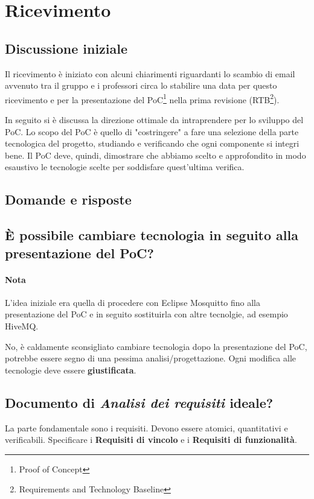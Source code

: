 \section{Ricevimento}

\subsection{Discussione iniziale}

Il ricevimento è iniziato con alcuni chiarimenti riguardanti lo scambio di email avvenuto tra il gruppo e i professori circa lo stabilire una data per questo ricevimento e per la presentazione del PoC\footnote{Proof of Concept} nella prima revisione (RTB\footnote{Requirements and Technology Baseline}).

In seguito si è discussa la direzione ottimale da intraprendere per lo sviluppo del PoC. Lo scopo del PoC è quello di "costringere" a fare una selezione della parte tecnologica del progetto, studiando e verificando che ogni componente si integri bene. Il PoC deve, quindi, dimostrare che abbiamo scelto e approfondito in modo esaustivo le tecnologie scelte per soddisfare quest'ultima verifica.

\subsection{Domande e risposte}

\subsection*{È possibile cambiare tecnologia in seguito alla presentazione del PoC?}

\paragraph{Nota} L'idea iniziale era quella di procedere con Eclipse Mosquitto fino alla presentazione del PoC e in seguito sostituirla con altre tecnolgie, ad esempio HiveMQ.

No, è caldamente sconsigliato cambiare tecnologia dopo la presentazione del PoC, potrebbe essere segno di una pessima analisi/progettazione. Ogni modifica alle tecnologie deve essere \textbf{giustificata}.

\subsection*{Documento di \emph{Analisi dei requisiti} ideale?}
La parte fondamentale sono i requisiti. Devono essere atomici, quantitativi e verificabili. Specificare i \textbf{Requisiti di vincolo} e i \textbf{Requisiti di funzionalità}.

